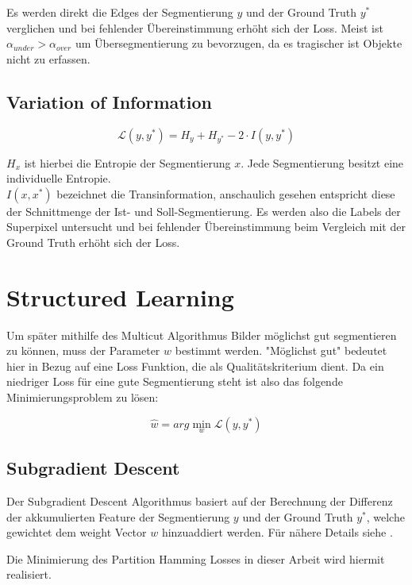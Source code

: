 Es werden direkt die Edges der Segmentierung $y$ und der Ground Truth $y^*$ verglichen und bei fehlender Übereinstimmung erhöht sich der Loss. Meist ist $\alpha_{under} > \alpha_{over}$ um Übersegmentierung zu bevorzugen, da es tragischer ist Objekte nicht zu erfassen.

\subsection{Variation of Information}

\begin{equation}
\mathcal{L}(y, y^*) = H_y + H_{y^*} - 2 \cdot I(y, y^*)
\end{equation}

$H_x$ ist hierbei die Entropie der Segmentierung $x$. Jede Segmentierung besitzt eine individuelle Entropie.  \\
$I(x, x^*)$ bezeichnet die Transinformation, anschaulich gesehen entspricht diese der Schnittmenge der Ist- und Soll-Segmentierung. 
Es werden also die Labels der Superpixel untersucht und bei fehlender Übereinstimmung beim Vergleich mit der Ground Truth erhöht sich der Loss.

\section{Structured Learning}\label{sec:strucLearn}

Um später mithilfe des Multicut Algorithmus Bilder möglichst gut segmentieren zu können, muss der Parameter $w$ bestimmt werden. "Möglichst gut" bedeutet hier in Bezug auf eine Loss Funktion, die als Qualitätskriterium dient. Da ein niedriger Loss für eine gute Segmentierung steht ist also das folgende Minimierungsproblem zu lösen:

\begin{equation}
\hat{w} = arg\min_{w} \mathcal{L}(y, y^*)
\end{equation}

\subsection{Subgradient Descent}

Der Subgradient Descent Algorithmus basiert auf der Berechnung der Differenz der akkumulierten Feature der Segmentierung $y$ und der Ground Truth $y^*$, welche gewichtet dem weight Vector $w$ hinzuaddiert werden. Für nähere Details siehe \cite{NowozinStrucLearn11}.

Die Minimierung des Partition Hamming Losses in dieser Arbeit wird hiermit realisiert.

